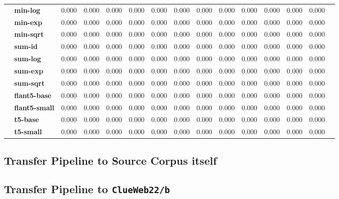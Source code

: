 \begin{table}[t]
{\begin{tabular}{clccccccccccccc}
            & \textbf{min-log}   & 0.000 & 0.000 & 0.000 & 0.000 & 0.000 & 0.000 & 0.000 & 0.000 & 0.000 & 0.000 & 0.000 & 0.000 \\
            & \textbf{min-exp}   & 0.000 & 0.000 & 0.000 & 0.000 & 0.000 & 0.000 & 0.000 & 0.000 & 0.000 & 0.000 & 0.000 & 0.000 \\
            & \textbf{min-sqrt}  & 0.000 & 0.000 & 0.000 & 0.000 & 0.000 & 0.000 & 0.000 & 0.000 & 0.000 & 0.000 & 0.000 & 0.000 \\
            & \textbf{sum-id}    & 0.000 & 0.000 & 0.000 & 0.000 & 0.000 & 0.000 & 0.000 & 0.000 & 0.000 & 0.000 & 0.000 & 0.000 \\
            & \textbf{sum-log}   & 0.000 & 0.000 & 0.000 & 0.000 & 0.000 & 0.000 & 0.000 & 0.000 & 0.000 & 0.000 & 0.000 & 0.000 \\
            & \textbf{sum-exp}   & 0.000 & 0.000 & 0.000 & 0.000 & 0.000 & 0.000 & 0.000 & 0.000 & 0.000 & 0.000 & 0.000 & 0.000 \\
            & \textbf{sum-sqrt}  & 0.000 & 0.000 & 0.000 & 0.000 & 0.000 & 0.000 & 0.000 & 0.000 & 0.000 & 0.000 & 0.000 & 0.000 \\
        \midrule
        \midrule
            & \textbf{flant5-base}   & 0.000 & 0.000 & 0.000 & 0.000 & 0.000 & 0.000 & 0.000 & 0.000 & 0.000 & 0.000 & 0.000 & 0.000 \\
            & \textbf{flant5-small}   & 0.000 & 0.000 & 0.000 & 0.000 & 0.000 & 0.000 & 0.000 & 0.000 & 0.000 & 0.000 & 0.000 & 0.000 \\
            & \textbf{t5-base}   & 0.000 & 0.000 & 0.000 & 0.000 & 0.000 & 0.000 & 0.000 & 0.000 & 0.000 & 0.000 & 0.000 & 0.000 \\
            & \textbf{t5-small}   & 0.000 & 0.000 & 0.000 & 0.000 & 0.000 & 0.000 & 0.000 & 0.000 & 0.000 & 0.000 & 0.000 & 0.000 \\

        \bottomrule 
    \end{tabular}}
    \renewcommand{\arraystretch}{1.0}
\end{table}

\subsection{Transfer Pipeline to Source Corpus itself}\label{eval-pairwise-preferences-source}

\subsection{Transfer Pipeline to \texttt{ClueWeb22/b}}\label{eval-pairwise-preferences-target}